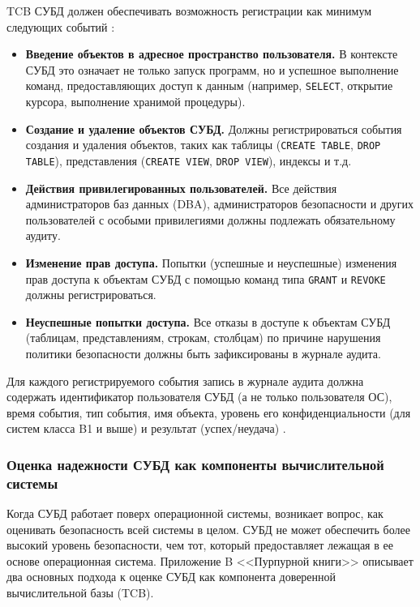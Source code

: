 \begin{enumerate}
\begin{itemize}
		TCB СУБД должен обеспечивать возможность регистрации как минимум следующих событий \cite[Section 4.2.2]{PurpleBook}:
		\begin{itemize}
			\item \textbf{Введение объектов в адресное пространство пользователя.} В контексте СУБД это означает не только запуск программ, но и успешное выполнение команд, предоставляющих доступ к данным (например, \texttt{SELECT}, открытие курсора, выполнение хранимой процедуры).
			\item \textbf{Создание и удаление объектов СУБД.} Должны регистрироваться события создания и удаления объектов, таких как таблицы (\texttt{CREATE TABLE}, \texttt{DROP TABLE}), представления (\texttt{CREATE VIEW}, \texttt{DROP VIEW}), индексы и т.д.
			\item \textbf{Действия привилегированных пользователей.} Все действия администраторов баз данных (DBA), администраторов безопасности и других пользователей с особыми привилегиями должны подлежать обязательному аудиту.
			\item \textbf{Изменение прав доступа.} Попытки (успешные и неуспешные) изменения прав доступа к объектам СУБД с помощью команд типа \texttt{GRANT} и \texttt{REVOKE} должны регистрироваться.
			\item \textbf{Неуспешные попытки доступа.} Все отказы в доступе к объектам СУБД (таблицам, представлениям, строкам, столбцам) по причине нарушения политики безопасности должны быть зафиксированы в журнале аудита.
		\end{itemize}
		Для каждого регистрируемого события запись в журнале аудита должна содержать идентификатор пользователя СУБД (а не только пользователя ОС), время события, тип события, имя объекта, уровень его конфиденциальности (для систем класса B1 и выше) и результат (успех/неудача) \cite[Section 4.2.2]{PurpleBook}.
	\end{itemize}
\end{enumerate}

\subsubsection{Оценка надежности СУБД как компоненты вычислительной системы}
Когда СУБД работает поверх операционной системы, возникает вопрос, как оценивать безопасность всей системы в целом. СУБД не может обеспечить более высокий уровень безопасности, чем тот, который предоставляет лежащая в ее основе операционная система. Приложение B <<Пурпурной книги>> \cite[Appendix B]{PurpleBook} описывает два основных подхода к оценке СУБД как компонента доверенной вычислительной базы (TCB).

